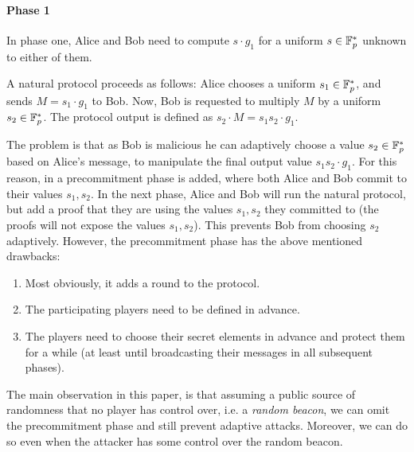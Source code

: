 \documentclass{article}
\begin{document}
\paragraph*{Phase 1} In phase one, Alice and Bob need to compute   $s\cdot g_1$ for a uniform $s\in {\mathbb F}_p^*$ unknown to either of them.

A natural protocol proceeds as follows: Alice chooses a uniform $s_1\in {\mathbb F}_p^*$, and sends $M=s_1\cdot g_1$ to Bob. 
Now, Bob is requested to multiply $M$ by a uniform $s_2\in {\mathbb F}_p^*$.
The protocol output is defined as $s_2\cdot M = s_1 s_2\cdot g_1$.


The problem is that as Bob is malicious he can adaptively choose a value $s_2\in{\mathbb F}_p^*$ based on Alice's message, to manipulate the final  output value $s_1 s_2\cdot g_1$.
For this reason, in \cite{BCGTV15, BGG17} a precommitment phase is added,
where both Alice and Bob commit to their values $s_1,s_2$.
In the next phase, Alice and Bob will run the natural protocol, but add a proof that they are using the values $s_1,s_2$ they committed to
 (the proofs will not expose the values $s_1,s_2$).
This prevents Bob from choosing $s_2$ adaptively.
However, the precommitment phase has the above mentioned  drawbacks: 
\begin{enumerate}
 \item Most obviously, it adds a round to the protocol.
\item The participating players need to be defined in advance.
 \item  The players need to choose their secret elements in advance and protect them for a while (at least until broadcasting their messages in all subsequent phases).
\end{enumerate}
The main observation in this paper, is that assuming a public source of randomness that no player has control over, i.e. a \emph{random beacon},
we can omit the precommitment phase and still prevent adaptive attacks. Moreover, we can do so even when the attacker has some control over the random beacon.
\end{document}
